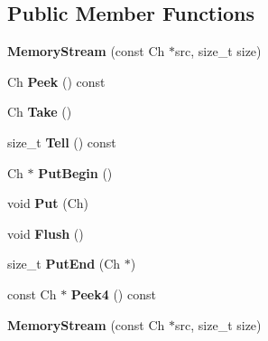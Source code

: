\subsection*{Public Member Functions}
\begin{DoxyCompactItemize}
\item 
\mbox{\label{structMemoryStream_a2472317ef00fcd44e5cc209e04c49756}} 
{\bfseries Memory\+Stream} (const Ch $\ast$src, size\+\_\+t size)
\item 
\mbox{\label{structMemoryStream_a707014bbfd303838b6a7b90be24f6adc}} 
Ch {\bfseries Peek} () const
\item 
\mbox{\label{structMemoryStream_a14ff92deda5d39c9b166aaa07e82a0ee}} 
Ch {\bfseries Take} ()
\item 
\mbox{\label{structMemoryStream_a2de1486742f0d44decda90a56bc43268}} 
size\+\_\+t {\bfseries Tell} () const
\item 
\mbox{\label{structMemoryStream_a5674d10aa2faa05cb326e2e16715cc3d}} 
Ch $\ast$ {\bfseries Put\+Begin} ()
\item 
\mbox{\label{structMemoryStream_ac445f93c23c9e85f1f5381911c4ed870}} 
void {\bfseries Put} (Ch)
\item 
\mbox{\label{structMemoryStream_a305e141314ae0e3afacb04aaf2d8bcc6}} 
void {\bfseries Flush} ()
\item 
\mbox{\label{structMemoryStream_a74fb36c1f6f95d189502cf7a6be79135}} 
size\+\_\+t {\bfseries Put\+End} (Ch $\ast$)
\item 
\mbox{\label{structMemoryStream_ac63422050829d9724086363247059089}} 
const Ch $\ast$ {\bfseries Peek4} () const
\item 
\mbox{\label{structMemoryStream_a2472317ef00fcd44e5cc209e04c49756}} 
{\bfseries Memory\+Stream} (const Ch $\ast$src, size\+\_\+t size)
\item 
\mbox{\label{structMemoryStream_a707014bbfd303838b6a7b90be24f6adc}} 

\end{DoxyCompactItemize}
